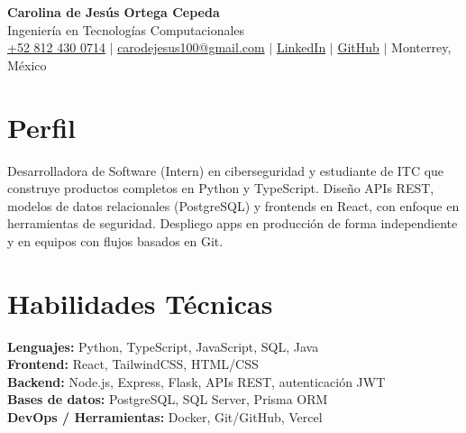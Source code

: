 \documentclass[10pt,letterpaper]{article}
\begin{document}
\begin{center}
    {\LARGE \textbf{Carolina de Jes\'us Ortega Cepeda}} \\
    \vspace{2pt}
    Ingenier\'ia en Tecnolog\'ias Computacionales \\
    \vspace{3pt}
    \href{tel:8124300714}{+52 812 430 0714} $|$
    \href{mailto:carodejesus100@gmail.com}{carodejesus100@gmail.com} $|$
    \href{https://www.linkedin.com/in/caro-ortega-cepeda-83ba3424b}{LinkedIn} $|$
    \href{https://github.com/AthensCort}{GitHub} $|$
    Monterrey, M\'exico
\end{center}

\section{Perfil}
Desarrolladora de Software (Intern) en ciberseguridad y estudiante de ITC que construye productos completos en Python y TypeScript. Dise\~no APIs REST, modelos de datos relacionales (PostgreSQL) y frontends en React, con enfoque en herramientas de seguridad. Despliego apps en producci\'on de forma independiente y en equipos con flujos basados en Git.

\section{Habilidades T\'ecnicas}
\textbf{Lenguajes:} Python, TypeScript, JavaScript, SQL, Java \\
\textbf{Frontend:} React, TailwindCSS, HTML/CSS \\
\textbf{Backend:} Node.js, Express, Flask, APIs REST, autenticaci\'on JWT \\
\textbf{Bases de datos:} PostgreSQL, SQL Server, Prisma ORM \\
\textbf{DevOps / Herramientas:} Docker, Git/GitHub, Vercel
\end{document}
